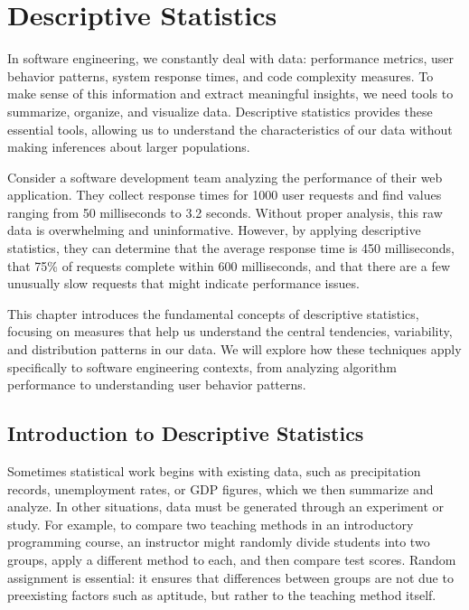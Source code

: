 \chapter{Descriptive Statistics}
\label{chap:ch6}

In software engineering, we constantly deal with data: performance metrics, user behavior patterns, system response times, and code complexity measures. To make sense of this information and extract meaningful insights, we need tools to summarize, organize, and visualize data. Descriptive statistics provides these essential tools, allowing us to understand the characteristics of our data without making inferences about larger populations.

Consider a software development team analyzing the performance of their web application. They collect response times for 1000 user requests and find values ranging from 50 milliseconds to 3.2 seconds. Without proper analysis, this raw data is overwhelming and uninformative. However, by applying descriptive statistics, they can determine that the average response time is 450 milliseconds, that 75\% of requests complete within 600 milliseconds, and that there are a few unusually slow requests that might indicate performance issues.

This chapter introduces the fundamental concepts of descriptive statistics, focusing on measures that help us understand the central tendencies, variability, and distribution patterns in our data. We will explore how these techniques apply specifically to software engineering contexts, from analyzing algorithm performance to understanding user behavior patterns.

\section{Introduction to Descriptive Statistics} \label{sec:ch6sec1}

Sometimes statistical work begins with existing data, such as precipitation records, unemployment rates, or GDP figures, which we then summarize and analyze. In other situations, data must be generated through an experiment or study. For example, to compare two teaching methods in an introductory programming course, an instructor might randomly divide students into two groups, apply a different method to each, and then compare test scores. Random assignment is essential: it ensures that differences between groups are not due to preexisting factors such as aptitude, but rather to the teaching method itself.  

